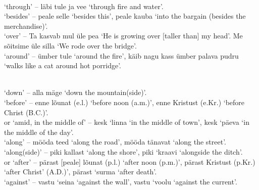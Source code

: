 \newLesson %
\label{lesson-40}

\Grammar %


\newSection \label{section-398}  \\

 `through' -- läbi tule ja vee `through fire and water'. \\

 `besides' -- peale selle `besides this', peale kauba `into the bargain (besides the merchandise)'.\\

 `over' -- Ta kasvab mul üle pea `He is growing over [taller than] my head'. Me sõitsime üle silla `We rode over the bridge'. \\

 `around' -- ümber tule `around the fire', käib nagu kass ümber palava pudru `walks like a cat around hot porridge'.

\newSection \label{section-399}  \\

 `down' -- alla mäge `down the mountain(side)'. \\

 `before' -- enne lõunat (e.l.) `before noon (a.m.)', enne Kristust (e.Kr.) `before Christ (B.C.)'. \\

 or  `amid, in the middle of' -- kesk `linna `in the middle of town', kesk `päeva `in the middle of the day'. \\

 `along' -- mööda teed `along the road', mööda tänavat `along the street'. \\

 `along(side)' -- piki kallast `along the shore', piki `kraavi `alongside the ditch'. \\

 or  `after' -- pärast [peale] lõunat (p.l.) `after noon (p.m.)', pärast Kristust (p.Kr.) `after Christ' (A.D.)', pärast `surma `after death'. \\

 `against' -- vastu `seina `against the wall', vastu `voolu `against the current'.

